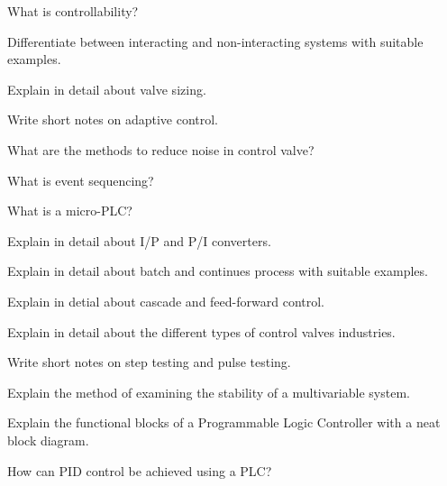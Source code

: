 \item What is controllability?


\markA

\partB


\item Differentiate between interacting and non-interacting systems with suitable examples.

\item Explain in detail about valve sizing.

\item Write short notes on adaptive control.

\item What are the methods to reduce noise in control valve?

\item What is event sequencing?

\item What is a micro-PLC?


\markB

\partCo


\item \iitem  Explain in detail about I/P and P/I converters.

\Or

\item Explain in detail about batch and continues process with suitable examples.

\ene

\newpage
\again
\item \iitem Explain in detial about cascade and feed-forward control.

\Or

\item Explain in detail about the different types of control valves industries.

\ene

\item \iitem Write short notes on step testing and pulse testing.

\Or 

\item Explain the method of examining the stability of a multivariable system.

\ene

\item \iitem Explain the functional blocks of a Programmable Logic Controller with a neat block
  diagram.

\Or

\item How can PID control be achieved using a PLC?

\ene

\ene
